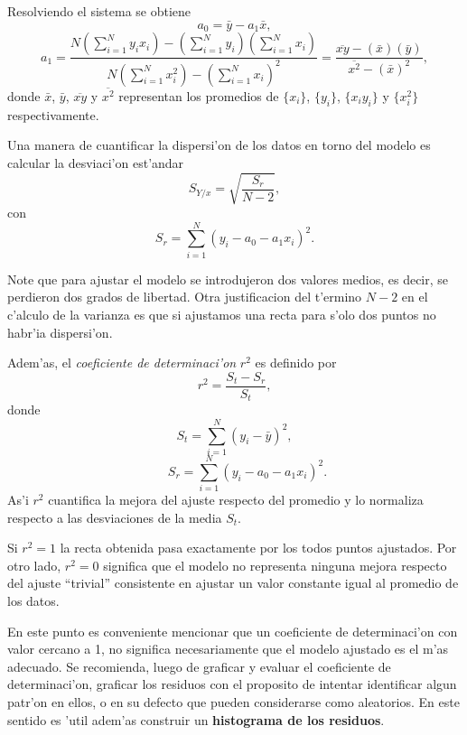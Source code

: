 Resolviendo el sistema se obtiene
\begin{equation}
a_0 = \bar{y}-a_1 \bar{x},
\end{equation}
\begin{equation}
a_1 =  \frac{N\left(\sum_{i=1}^N y_{i}x_{i}\right)-\left(\sum_{i=1}^N y_{i}\right)\left(\sum_{i=1}^N x_{i}\right) }{N\left(\sum_{i=1}^N x_{i}^{2}\right)- \left(\sum_{i=1}^N x_{i}\right)^{2}}=\frac{\overline{xy}-(\bar{x})(\bar{y})}{\overline{x^2}-(\bar{x})^2},
\end{equation}
donde $\bar{x}$, $\bar{y}$, $\overline{xy}$ y $\overline{x^2}$ representan los promedios de $\{x_i\}$, $\{ y_i\}$, $\{x_iy_i\}$ y $\{x_i^2\}$ respectivamente. 

Una manera de cuantificar la dispersi'on de los datos en torno del modelo es calcular la desviaci'on est'andar
\begin{equation}
S_{Y/x} = \sqrt{\dfrac{S_{r}}{N-2}},
\end{equation}
con 
\begin{equation}
S_{r}= \sum_{i=1}^N (y_{i} - a_0 - a_1 x_{i})^{2}.
\end{equation}

Note que para ajustar el modelo se introdujeron dos valores medios, es decir, se perdieron dos grados de libertad. Otra justificacion del t'ermino $N-2$ en el c'alculo de la varianza es que si ajustamos una recta para s'olo dos puntos no habr'ia dispersi'on.


Adem'as, el \textit{coeficiente de determinaci'on} $r^2$ es definido por
\begin{equation}\label{r2}
r^2 = \dfrac{S_{t} - S_{r}}{S_{t}},
\end{equation}
donde 
\begin{equation}\label{St}
S_t = \sum_{i=1}^N\left(y_i-\bar{y}\right)^2, 
\end{equation}
\begin{equation}
\qquad S_{r}= \sum_{i=1}^N (y_{i} - a_0 - a_1 x_{i})^{2}.
\end{equation}
As'i $r^{2}$ cuantifica la mejora del ajuste respecto del promedio y lo normaliza respecto a las desviaciones de la media $S_t$.

Si $r^{2}=1$ la recta obtenida pasa exactamente por los todos puntos ajustados. Por otro lado, $r^{2}=0$ significa que el modelo no representa ninguna mejora respecto del ajuste ``trivial'' consistente en ajustar un valor constante igual al promedio de los datos.

En este punto es conveniente mencionar que un coeficiente de determinaci'on con valor cercano a 1, no significa necesariamente que el modelo ajustado es el m'as adecuado. Se recomienda, luego de graficar y evaluar el coeficiente de determinaci'on, graficar los residuos con el proposito de intentar identificar algun patr'on en ellos, o en su defecto que pueden considerarse como aleatorios. En este sentido es 'util adem'as construir un \textbf{histograma de los residuos}.

